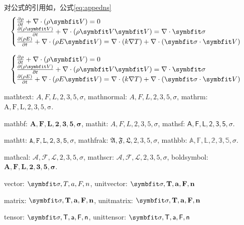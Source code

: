 \label{chap:app1}{

对公式的引用如，公式\eqref{eq:appedns}
\begin{equation} \label{eq:appedns}
    \begin{cases}
        \frac{\partial \rho}{\partial t} + \nabla\cdot(\rho\Vector{V}) = 0\\
        \frac{\partial (\rho\Vector{V})}{\partial t} + \nabla\cdot(\rho\Vector{V}\Vector{V}) = \nabla\cdot\Tensor{\sigma}\\
        \frac{\partial (\rho E)}{\partial t} + \nabla\cdot(\rho E\Vector{V}) = \nabla\cdot(k\nabla T) + \nabla\cdot(\Tensor{\sigma}\cdot\Vector{V})
    \end{cases}
\end{equation}

\begin{equation} \label{eq:appedns2}
    \begin{cases}
        \frac{\partial \rho}{\partial t} + \nabla\cdot(\rho\Vector{V}) = 0\\
        \frac{\partial (\rho\Vector{V})}{\partial t} + \nabla\cdot(\rho\Vector{V}\Vector{V}) = \nabla\cdot\Tensor{\sigma}\\
        \frac{\partial (\rho E)}{\partial t} + \nabla\cdot(\rho E\Vector{V}) = \nabla\cdot(k\nabla T) + \nabla\cdot(\Tensor{\sigma}\cdot\Vector{V})
    \end{cases}
\end{equation}


mathtext: $A,F,L,2,3,5,\sigma$, mathnormal: $A,F,L,2,3,5,\sigma$, mathrm: $\mathrm{A,F,L,2,3,5,\sigma}$.

mathbf: $\mathbf{A,F,L,2,3,5,\sigma}$, mathit: $\mathit{A,F,L,2,3,5,\sigma}$, mathsf: $\mathsf{A,F,L,2,3,5,\sigma}$.

mathtt: $\mathtt{A,F,L,2,3,5,\sigma}$, mathfrak: $\mathfrak{A,F,L,2,3,5,\sigma}$, mathbb: $\mathbb{A,F,L,2,3,5,\sigma}$.

mathcal: $\mathcal{A,F,L,2,3,5,\sigma}$, mathscr: $\mathscr{A,F,L,2,3,5,\sigma}$, boldsymbol: $\boldsymbol{A,F,L,2,3,5,\sigma}$.

vector: $\Vector{\sigma, T, a, F, n}$, unitvector: $\unitVector{\sigma, T, a, F, n}$

matrix: $\Matrix{\sigma, T, a, F, n}$, unitmatrix: $\unitMatrix{\sigma, T, a, F, n}$

tensor: $\Tensor{\sigma, T, a, F, n}$, unittensor: $\unitTensor{\sigma, T, a, F, n}$ 


}
